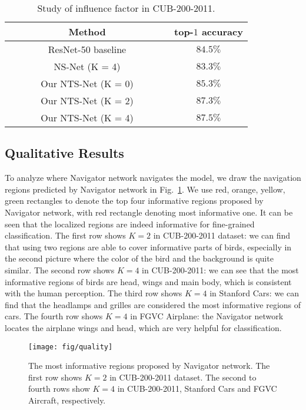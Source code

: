 \documentclass[runningheads]{llncs}
\begin{document}
\begin{table}[ht]
	\begin{center}
	\begin{tabular}{|c|c|}
	\hline
	Method & top-$1$ accuracy \\
	\hline\hline
	ResNet-50 baseline & $84.5\%$ \\
	\hline
	NS-Net (K = 4) & $83.3\%$ \\
	\hline
	Our NTS-Net (K = 0) & $85.3\%$\\
	\hline
	Our NTS-Net (K = 2) & $87.3\%$\\
	\hline
	~~~~~~ Our NTS-Net (K = 4) ~~~~~~ & $\mathbf{87.5\%}$\\
	\hline
	\end{tabular}
	\end{center}
\caption{Study of influence factor in CUB-200-2011.}
\label{factor}
\end{table}
\subsection{Qualitative Results}
To analyze where Navigator network navigates the model, we draw the navigation regions predicted by Navigator network in Fig.~\ref{quality}. We use red, orange, yellow, green rectangles to denote the top four informative regions proposed by Navigator network, with red rectangle denoting most informative one. It can be seen that the localized regions are indeed informative for fine-grained classification. The first row shows $K=2$ in CUB-200-2011 dataset: we can find that using two regions are able to cover informative parts of birds, especially in the second picture where the color of the bird and the background is quite similar. The second row shows $K=4$ in CUB-200-2011: we can see that the most informative regions of birds are head, wings and main body, which is consistent with the human perception. The third row shows $K=4$ in Stanford Cars: we can find that the headlamps and grilles are considered the most informative regions of cars. The fourth row shows $K=4$ in FGVC Airplane: the Navigator network locates the airplane wings and head, which are very helpful for classification. 

\begin{figure}[ht]
\begin{center}
\texttt{[image: fig/quality]}
\end{center}
   \caption{The most informative regions proposed by Navigator network. The first row shows $K=2$ in CUB-200-2011 dataset. The second to fourth rows show $K=4$ in CUB-200-2011, Stanford Cars and FGVC Aircraft, respectively.}
\label{quality}
\end{figure}
\end{document}
